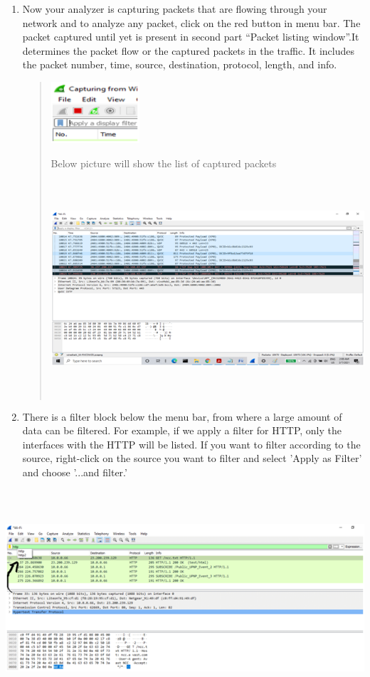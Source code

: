 \documentclass[12pt, a4paper]{report}
\begin{document}
\begin{enumerate}
\def\labelenumi{\arabic{enumi})}
\item
  Now your analyzer is capturing packets that are flowing through your
  network and to analyze any packet, click on the red button in menu
  bar. The packet captured until yet is present in second part ``Packet
  listing window''.It determines the packet flow or the captured packets
  in the traffic. It includes the packet number, time, source,
  destination, protocol, length, and info.


\begin{quote}
\includegraphics[width=1.30729in,height=0.89583in]{image4.png}

Below picture will show the list of captured packets

\includegraphics[width=5.60628in,height=3.16538in]{image1.png}
\end{quote}


\def\labelenumi{\arabic{enumi})}
\item
  There is a filter block below the menu bar, from where a large amount
  of data can be filtered. For example, if we apply a filter for HTTP,
  only the interfaces with the HTTP will be listed. If you want to
  filter according to the source, right-click on the source you want to
  filter and select 'Apply as Filter' and choose '...and filter.'
\end{enumerate}

\includegraphics[width=5.60628in,height=3.16538in]{image2.png}
\end{document}
